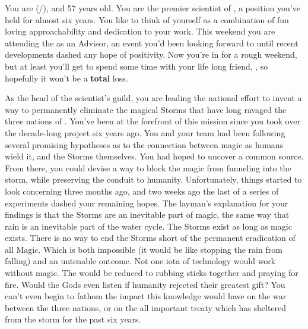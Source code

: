 \documentclass[char]{GL2020}
\begin{document}
\name{\cHeadScientist{}}

You are \cHeadScientist{\full} (\cHeadScientist{\they}/\cHeadScientist{\them}), and 57 years old.  You are the premier scientist of \pTech{}, a position you've held for almost six years. You like to think of yourself as a combination of fun loving approachability and dedication to your work. This weekend you are attending the \pSchool{} as an Advisor, an event you'd been looking forward to until recent developments dashed any hope of positivity. Now you're in for a rough weekend, but at least you'll get to spend some time with your life long friend, \cChupInventor{\full}, so hopefully it won’t be a \textbf{total} loss.

As the head of the \pTech{} scientist's guild, you are leading the national effort to invent a way to permanently eliminate the magical Storms that have long ravaged the three nations of \pEarth{}.  You've been at the forefront of this mission since you took over the decade-long project six years ago. You and your team had been following several promising hypotheses as to the connection between magic as humans wield it, and the Storms themselves. You had hoped to uncover a common source. From there, you could devise a way to block the magic from funneling into the storm, while preserving the conduit to humanity. Unfortunately, things started to look concerning three months ago, and two weeks ago the last of a series of experiments dashed your remaining hopes. The layman's explanation for your findings is that the Storms are an inevitable part of magic, the same way that rain is an inevitable part of the water cycle. The Storms exist as long as magic exists. There is no way to end the Storms short of the permanent eradication of all Magic. Which is both impossible (it would be like stopping the rain from falling) and an untenable outcome. Not one iota of technology would work without magic. The \pTech{} would be reduced to rubbing sticks together and praying for fire. Would the Gods even listen if humanity rejected their greatest gift? You can't even begin to fathom the impact this knowledge would have on the war between the three nations, or on the all important treaty which has sheltered \pTech{} from the storm for the past six years.  
\end{document}
